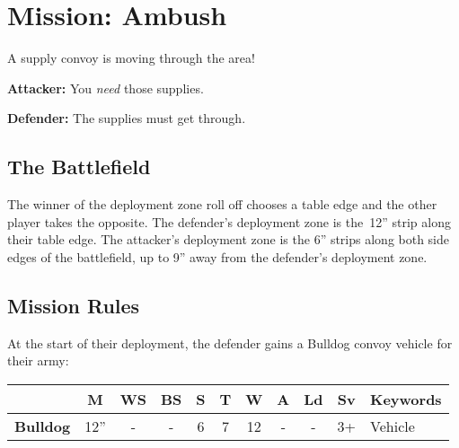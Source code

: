 \clearpage
\section{Mission: Ambush}

A supply convoy is moving through the area!
\begin{squishitemize}
\item{\bf Attacker:} You \emph{need} those supplies.
\item{\bf Defender:} The supplies must get through.
\end{squishitemize}

\subsection{\bf The Battlefield}%

The winner of the deployment zone roll off chooses a table edge and
the other player takes the opposite.  The defender's deployment zone
is the~12'' strip along their table edge.  The attacker's deployment
zone is the 6'' strips along both side edges of the battlefield, up to
9'' away from the defender's deployment zone.

\subsection{\bf Mission Rules}%


At the start of their deployment, the defender gains a Bulldog convoy
vehicle for their army:

\vspace*{-9pt}
  \begin{center}
  \begin{tabular}[t]{O{1.5in}cccccccccE{1.5in}}
    & {\bf M} & {\bf WS} &  {\bf BS} & {\bf S} & {\bf T} & {\bf W} & {\bf A} & {\bf Ld} & {\bf Sv} & {\bf Keywords}\\
    \hline
    {\bf Bulldog} & 12'' & - & - & 6 & 7 & 12 & - & - & 3+ & Vehicle\\
  \end{tabular}
  \end{center}

